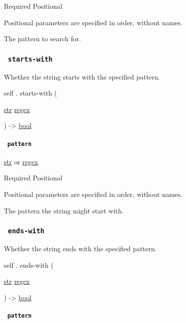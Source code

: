 {Required} {{ Positional }}

\label{definitions-contains-pattern-positional-tooltip}
Positional parameters are specified in order, without names.

The pattern to search for.

\subsubsection{\texorpdfstring{\texttt{\ starts-with\ }}{ starts-with }}\label{definitions-starts-with}

Whether the string starts with the specified pattern.

self { . } { starts-with } (

{ \href{/docs/reference/foundations/str/}{str}
\href{/docs/reference/foundations/regex/}{regex} }

) -\textgreater{} \href{/docs/reference/foundations/bool/}{bool}

\paragraph{\texorpdfstring{\texttt{\ pattern\ }}{ pattern }}\label{definitions-starts-with-pattern}

\href{/docs/reference/foundations/str/}{str} {or}
\href{/docs/reference/foundations/regex/}{regex}

{Required} {{ Positional }}

\label{definitions-starts-with-pattern-positional-tooltip}
Positional parameters are specified in order, without names.

The pattern the string might start with.

\subsubsection{\texorpdfstring{\texttt{\ ends-with\ }}{ ends-with }}\label{definitions-ends-with}

Whether the string ends with the specified pattern.

self { . } { ends-with } (

{ \href{/docs/reference/foundations/str/}{str}
\href{/docs/reference/foundations/regex/}{regex} }

) -\textgreater{} \href{/docs/reference/foundations/bool/}{bool}

\paragraph{\texorpdfstring{\texttt{\ pattern\ }}{ pattern }}\label{definitions-ends-with-pattern}

